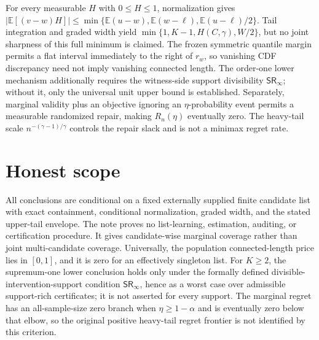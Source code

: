 \documentclass{article}
\begin{document}
For every measurable \(H\) with \(0\le H\le1\), normalization gives \(|\mathbb E[(v-w)H]|\le\min\{\mathbb E(u-w),\mathbb E(w-\ell),\mathbb E(u-\ell)/2\}\). Tail integration and graded width yield \(\min\{1,K-1,H(C,\gamma),W/2\}\), but no joint sharpness of this full minimum is claimed. The frozen symmetric quantile margin permits a flat interval immediately to the right of \(r_w\), so vanishing CDF discrepancy need not imply vanishing connected length. The order-one lower mechanism additionally requires the witness-side support divisibility \(\mathsf{SR}_\infty\); without it, only the universal unit upper bound is established. Separately, marginal validity plus an objective ignoring an \(\eta\)-probability event permits a measurable randomized repair, making \(R_n(\eta)\) eventually zero. The heavy-tail scale \(n^{-(\gamma-1)/\gamma}\) controls the repair slack and is not a minimax regret rate.

\section{Honest scope}

All conclusions are conditional on a fixed externally supplied finite candidate list with exact containment, conditional normalization, graded width, and the stated upper-tail envelope. The note proves no list-learning, estimation, auditing, or certification procedure. It gives candidate-wise marginal coverage rather than joint multi-candidate coverage. Universally, the population connected-length price lies in \([0,1]\), and it is zero for an effectively singleton list. For \(K\ge2\), the supremum-one lower conclusion holds only under the formally defined divisible-intervention-support condition \(\mathsf{SR}_\infty\), hence as a worst case over admissible support-rich certificates; it is not asserted for every support. The marginal regret has an all-sample-size zero branch when \(\eta\ge1-\alpha\) and is eventually zero below that elbow, so the original positive heavy-tail regret frontier is not identified by this criterion.
\end{document}
